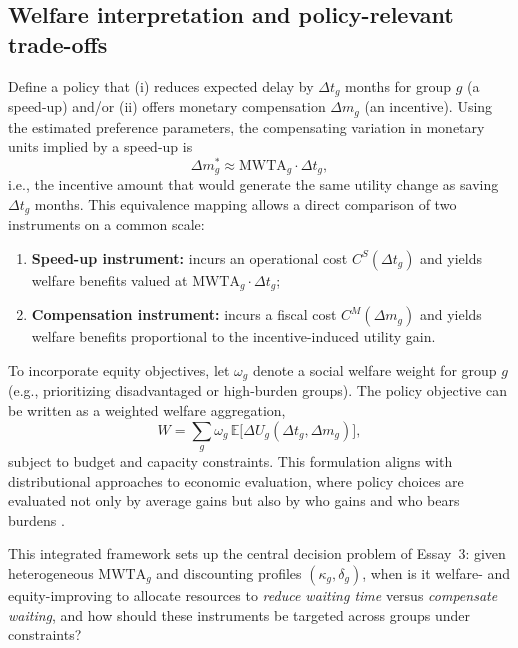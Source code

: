 \documentclass[doublespacing]{utdthesis}
\let\cite=\citep
\begin{document}
\subsection{Welfare interpretation and policy-relevant trade-offs}
\label{subsec:essay3_welfare}

Define a policy that (i) reduces expected delay by $\Delta t_{g}$ months for group $g$ (a speed-up) and/or (ii) offers monetary compensation $\Delta m_{g}$ (an incentive). Using the estimated preference parameters, the compensating variation in monetary units implied by a speed-up is
\begin{equation}
\Delta m^{\ast}_{g} \approx \text{MWTA}_g \cdot \Delta t_{g},
\end{equation}
i.e., the incentive amount that would generate the same utility change as saving $\Delta t_g$ months. This equivalence mapping allows a direct comparison of two instruments on a common scale:
\begin{enumerate}
\item \textbf{Speed-up instrument:} incurs an operational cost $C^{S}(\Delta t_g)$ and yields welfare benefits valued at $\text{MWTA}_g \cdot \Delta t_g$;
\item \textbf{Compensation instrument:} incurs a fiscal cost $C^{M}(\Delta m_g)$ and yields welfare benefits proportional to the incentive-induced utility gain.
\end{enumerate}

To incorporate equity objectives, let $\omega_g$ denote a social welfare weight for group $g$ (e.g., prioritizing disadvantaged or high-burden groups). The policy objective can be written as a weighted welfare aggregation,
\begin{equation}
W = \sum_{g} \omega_g \, \mathbb{E}\big[\Delta U_g(\Delta t_g,\Delta m_g)\big],
\end{equation}
subject to budget and capacity constraints. This formulation aligns with distributional approaches to economic evaluation, where policy choices are evaluated not only by average gains but also by who gains and who bears burdens \cite{Asaria2016,Cookson2017}.

This integrated framework sets up the central decision problem of Essay~3: given heterogeneous $\text{MWTA}_g$ and discounting profiles $(\kappa_g,\delta_g)$, when is it welfare- and equity-improving to allocate resources to \emph{reduce waiting time} versus \emph{compensate waiting}, and how should these instruments be targeted across groups under constraints?
\end{document}
